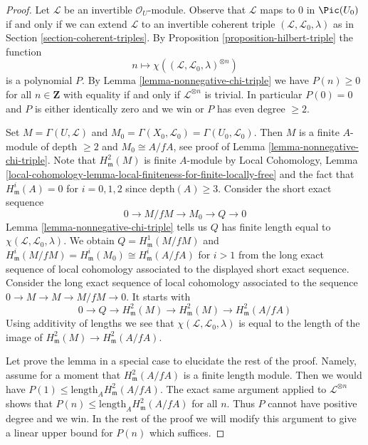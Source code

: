\begin{proof}
Let $\mathcal{L}$ be an invertible $\mathcal{O}_U$-module.
Observe that $\mathcal{L}$ maps to $0$ in $\Pic(U_0)$
if and only if we can extend $\mathcal{L}$ to an invertible
coherent triple $(\mathcal{L}, \mathcal{L}_0, \lambda)$
as in Section \ref{section-coherent-triples}.
By Proposition \ref{proposition-hilbert-triple}
the function
$$
n \longmapsto \chi((\mathcal{L}, \mathcal{L}_0, \lambda)^{\otimes n})
$$
is a polynomial $P$. By Lemma \ref{lemma-nonnegative-chi-triple}
we have
$P(n) \geq 0$ for all $n \in \mathbf{Z}$ with equality if and only if
$\mathcal{L}^{\otimes n}$ is trivial. In particular $P(0) = 0$
and $P$ is either identically zero and we win or $P$ has even degree $\geq 2$.

\medskip\noindent
Set $M = \Gamma(U, \mathcal{L})$ and
$M_0 = \Gamma(X_0, \mathcal{L}_0) = \Gamma(U_0, \mathcal{L}_0)$.
Then $M$ is a finite $A$-module of depth $\geq 2$
and $M_0 \cong A/fA$, see proof of Lemma \ref{lemma-nonnegative-chi-triple}.
Note that $H^2_\mathfrak m(M)$ is finite $A$-module by
Local Cohomology, Lemma
\ref{local-cohomology-lemma-local-finiteness-for-finite-locally-free}
and the fact that $H^i_\mathfrak m(A) = 0$ for $i = 0, 1, 2$
since $\text{depth}(A) \geq 3$.
Consider the short exact sequence
$$
0 \to M/fM \to M_0 \to Q \to 0
$$
Lemma \ref{lemma-nonnegative-chi-triple} tells us $Q$ has finite length
equal to $\chi(\mathcal{L}, \mathcal{L}_0, \lambda)$.
We obtain $Q = H^1_\mathfrak m(M/fM)$ and
$H^i_\mathfrak m(M/fM) = H^i_\mathfrak m(M_0) \cong H^i_\mathfrak m(A/fA)$
for $i > 1$ from the long exact sequence of local cohomology
associated to the displayed short exact sequence. Consider the long
exact sequence of local cohomology associated to the sequence
$0 \to M \to M \to M/fM \to 0$. It starts with
$$
0 \to Q \to H^2_\mathfrak m(M) \to H^2_\mathfrak m(M) \to
H^2_\mathfrak m(A/fA)
$$
Using additivity of lengths we see that
$\chi(\mathcal{L}, \mathcal{L}_0, \lambda)$
is equal to the length of the image of
$H^2_\mathfrak m(M) \to H^2_\mathfrak m(A/fA)$.

\medskip\noindent
Let prove the lemma in a special case to elucidate the rest of the proof.
Namely, assume for a moment that $H^2_\mathfrak m(A/fA)$ is
a finite length module. Then
we would have $P(1) \leq \text{length}_A H^2_\mathfrak m(A/fA)$.
The exact same argument applied to $\mathcal{L}^{\otimes n}$ shows that
$P(n) \leq \text{length}_A H^2_\mathfrak m(A/fA)$ for all $n$.
Thus $P$ cannot have positive degree and we win.
In the rest of the proof we will modify this argument to give
a linear upper bound for $P(n)$ which suffices.


\end{proof}
